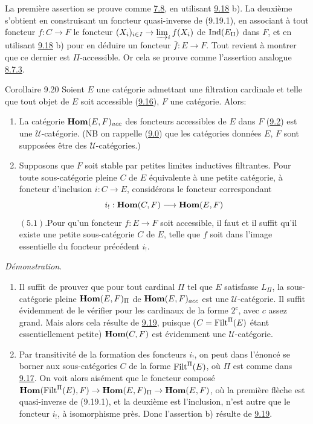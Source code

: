 \documentclass[10pt]{../fichiers-configuration-latex/smfart}
\def\labelenumi{(\theenumi)}
\begin{document}
La première assertion se prouve comme \hyperref[I.prop7.8]{7.8}, en utilisant
\hyperref[I.cor9.18]{9.18} b). La deuxième s'obtient en construisant un
foncteur quasi-inverse de (9.19.1), en associant à tout
foncteur $f:C\rightarrow F$ le foncteur $(X_i)_{i\in I}\rightarrow
\varinjlim_i f(X_i)$ de $\operatorname{Ind}(E_{\Pi})$ dans $F$, et en utilisant
\hyperref[I.cor9.18]{9.18} b) pour en déduire un foncteur $\bar{f}:E\rightarrow
F$. Tout revient à %
montrer que ce%
dernier est $\Pi$-accessible. Or cela se prouve comme l'assertion
analogue \hyperref[I.prop8.7.3]{8.7.3}.

\begin{enonce*}{Corollaire 9.20}
Soient $E$ une catégorie admettant une filtration cardinale et telle
que tout objet de $E$ soit accessible (\cf \hyperref[I.prop9.16]{9.16}), $F$
une catégorie. Alors:
\begin{enumerate}
\renewcommand{\theenumi}{\alph{enumi}}
\renewcommand{\labelenumi}{\theenumi)}
\item La catégorie $\operatorname{\mathbf{Hom}}(E,F)_{acc}$ des foncteurs accessibles
de $E$ dans $F$ (\hyperref[I.def9.2]{9.2}) est une
$𝒰$-catégorie. ({\rm NB} on
rappelle (\hyperref[I.sec9.0]{9.0}) que les catégories données $E$, $F$
sont supposées
être des $𝒰$-catégories.)

\item Supposons que $F$ soit stable par petites limites inductives
filtrantes. Pour toute sous-catégorie pleine $C$ de $E$ équivalente
à une petite catégorie, à foncteur d'inclusion $i:C\rightarrow E$,
considérons le foncteur correspondant
$$
i_{!}:\operatorname{\mathbf{Hom}}(C,F)\longrightarrow \operatorname{\mathbf{Hom}}(E,F)
$$
$(5.1)$.\pageoriginale Pour qu'un foncteur $f:E\rightarrow F$ soit
accessible, il faut et il suffit qu'il existe une petite
sous-catégorie $C$ de $E$, telle que $f$ soit dans l'image
essentielle du foncteur précédent $i_{!}$.
\end{enumerate}
\end{enonce*}

\noindent \emph{Démonstration}.
\begin{enumerate}
\renewcommand{\theenumi}{\alph{enumi}}
\renewcommand{\labelenumi}{\theenumi)}
\item Il suffit de prouver que pour tout cardinal $\Pi$ tel que $E$
satisfasse $L_{\Pi}$, la sous-catégorie pleine $\operatorname{\mathbf{Hom}}(E,F)_{\Pi}$ de
$\operatorname{\mathbf{Hom}}(E,F)_{acc}$ est une $𝒰$-catégorie. Il suffit
évidemment de le vérifier pour les cardinaux de la forme $2^c$, avec
$c$ assez grand. Mais alors cela résulte de \hyperref[I.cor9.19]{9.19}, puisque
($C=\operatorname{Filt}^{\Pi}(E)$ étant essentiellement petite) $\operatorname{\mathbf{Hom}}(C,F)$ est
évidemment une $𝒰$-catégorie.

\item Par transitivité de la formation des foncteurs $i_{!}$, on
peut dans l'énoncé se borner aux sous-catégories $C$ de la forme
$\operatorname{Filt}^{\Pi}(E)$, où $\Pi$ est comme dans \hyperref[I.cor9.17]{9.17}. On voit alors
aisément que le foncteur composé $\operatorname{\mathbf{Hom}}(\operatorname{Filt}^{\Pi}(E),F)\rightarrow
\operatorname{\mathbf{Hom}}(E,F)_{\Pi}\rightarrow \operatorname{\mathbf{Hom}}(E,F)$, où la première flèche est
quasi-inverse de (9.19.1), et la deuxième est l'inclusion, n'est
autre que le foncteur $i_{!}$, à isomorphisme près. Donc l'assertion
b) résulte de \hyperref[I.cor9.19]{9.19}.
\end{enumerate}
\end{document}
